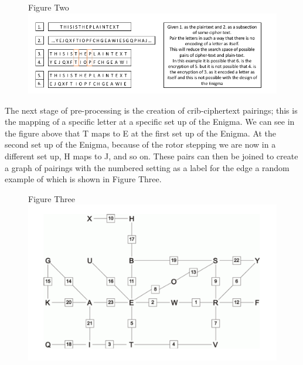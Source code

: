 \documentclass[12pt,a4paper]{article}
\begin{document}
\begin{figure}[h]
\centering
Figure Two
\includegraphics[width=\textwidth]{StageOneBOMBE.png}
\end{figure}

The next stage of pre-processing is the creation of crib-ciphertext pairings; this is the mapping of a specific letter at a specific set up of the Enigma. We can see in the figure above that T maps to E at the first set up of the Enigma. At the second set up of the Enigma, because of the rotor stepping we are now in a different set up, H maps to J, and so on. These pairs can then be joined to create a graph of pairings with the numbered setting as a label for the edge a random example of which is shown in Figure Three.

\begin{figure}[h]
\centering
Figure Three
\includegraphics[width=\textwidth]{StageTwoBOMBE.png}
\end{figure}
\end{document}
